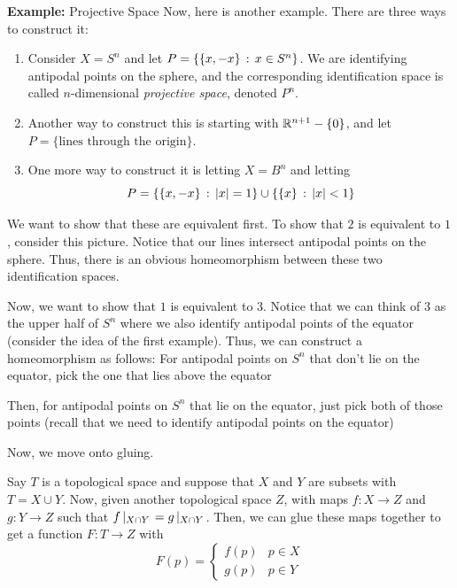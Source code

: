 \begin{example}{\textbf{Example: }Projective Space}
    Now, here is another example. There are three ways to construct it:
    \begin{enumerate}
        \item Consider $X = S^{n}$ and let $P = \{\{x, -x\} \, :\, x \in S^n\}$. We are identifying antipodal points on the sphere, and the corresponding identification space is called $n$-dimensional \emph{projective space}, denoted $P^{n}$.
        \item Another way to construct this is starting with $\mathbb{R}^{n + 1} - \{0\}$, and let $P = \{\text{lines through the origin}\}$. \\
        \item One more way to construct it is letting $X = B^{n}$ and letting
        \[ P = \{\{x, -x\} \, :\, \left\lvert {x} \right\rvert = 1\} \cup \{\{x\} \, :\, \left\lvert {x} \right\rvert < 1\} \]
    \end{enumerate}
    We want to show that these are equivalent first. To show that $2$ is equivalent to $1$, consider this picture. Notice that our lines intersect antipodal points on the sphere. Thus, there is an obvious homeomorphism between these two identification spaces.

    Now, we want to show that $1$ is equivalent to $3$. Notice that we can think of $3$ as the upper half of $S^{n}$ where we also identify antipodal points of the equator (consider the idea of the first example). Thus, we can construct a homeomorphism as follows: For antipodal points on $S^n$ that don't lie on the equator, pick the one that lies above the equator

    Then, for antipodal points on $S^n$ that lie on the equator, just pick both of those points (recall that we need to identify antipodal points on the equator)
\end{example}

Now, we move onto gluing.\\

\begin{definition}
    Say $T$ is a topological space and suppose that $X$ and $Y$ are subsets with $T = X \cup Y$. Now, given another topological space $Z$, with maps $f : X \to Z$ and $g : Y \to Z$ such that $f\left|_{X \cap Y}\right. = g\left|_{X \cap Y}\right.$. Then, we can glue these maps together to get a function $F : T \to Z$ with
    \[ F(p) = \left\{\begin{matrix} f(p) & p \in X \\ g(p) & p \in Y \end{matrix}\right. \]
\end{definition}

